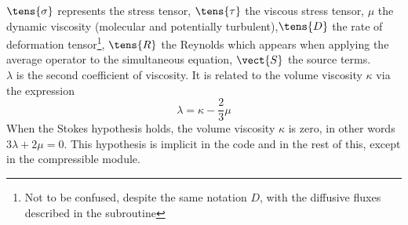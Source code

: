 $\tens{\sigma}$ represents the stress tensor, $\tens{\tau}$ the viscous stress tensor,
$\mu$ the dynamic viscosity (molecular and potentially turbulent),$\tens{D}$
the rate of deformation tensor\footnote{Not to be confused, despite the same
notation $D$, with the diffusive fluxes described in the subroutine
}, $\tens{R}$ the Reynolds which appears when applying the
average operator to the simultaneous equation, $\vect{S}$ the source
terms.\\
$\lambda$ is the second coefficient of viscosity. It is related to the volume viscosity
 $\kappa$ via the expression
\begin{equation}
\lambda=\kappa-\frac{2}{3}\mu
\end{equation}
When the Stokes hypothesis holds, the volume viscosity $\kappa$ is
zero, in other words $3\lambda+2\mu=0$. This hypothesis is implicit in the code
and in the rest of this, except in the compressible module.\\


